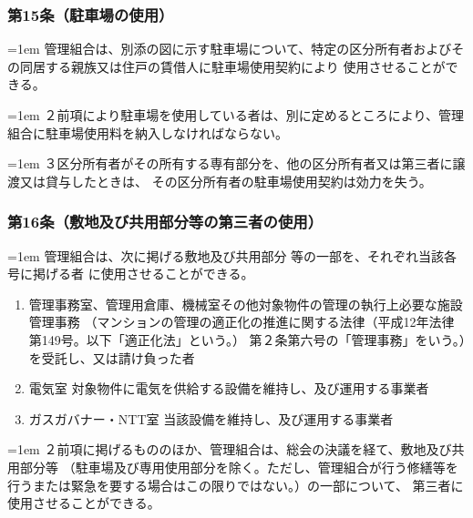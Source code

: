 \documentclass[
  luatex,
  paper=a4paper,
  fontsize=11pt,
  jafontsize=11pt,
  jlreq_notes,
]{jlreq}
\newcommand{\joumain}[1]{%
  \noindent\hangindent=1em\hangafter=1
  \hspace{1em}#1%
}
\newcommand{\kou}[2]{%
  \par\noindent\hangindent=1em\hangafter=1
  #1\hspace{1em}#2%
}
\begin{document}
  \subsubsection*{第15条（駐車場の使用）}
  \joumain{管理組合は、別添の図に示す駐車場について、特定の区分所有者およびその同居する親族又は住戸の賃借人に駐車場使用契約により
  使用させることができる。}
  \kou{２}{前項により駐車場を使用している者は、別に定めるところにより、管理組合に駐車場使用料を納入しなければならない。}
  \kou{３}{区分所有者がその所有する専有部分を、他の区分所有者又は第三者に譲渡又は貸与したときは、 その区分所有者の駐車場使用契約は効力を失う。}

  \subsubsection*{第16条（敷地及び共用部分等の第三者の使用）}
  \joumain{管理組合は、次に掲げる敷地及び共用部分 等の一部を、それぞれ当該各号に掲げる者 に使用させることができる。}
  \begin{enumerate}
    \item 管理事務室、管理用倉庫、機械室その他対象物件の管理の執行上必要な施設 管理事務
      （マンションの管理の適正化の推進に関する法律（平成12年法律第149号。以下「適正化法」という。）
      第２条第六号の「管理事務」をいう。）を受託し、又は請け負った者
    \item 電気室 対象物件に電気を供給する設備を維持し、及び運用する事業者
    \item ガスガバナー・NTT室 当該設備を維持し、及び運用する事業者
  \end{enumerate}
  \kou{２}{前項に掲げるもののほか、管理組合は、総会の決議を経て、敷地及び共用部分等
  （駐車場及び専用使用部分を除く。ただし、管理組合が行う修繕等を行うまたは緊急を要する場合はこの限りではない。）の一部について、
  第三者に使用させることができる。}
\end{document}
